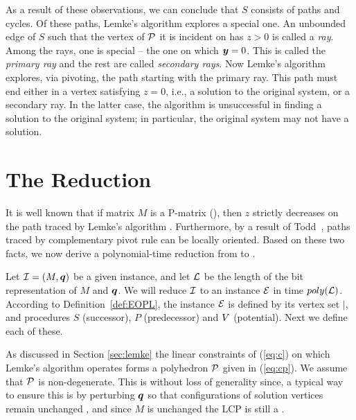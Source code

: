 As a result of these observations, we can conclude that $S$ consists of paths and cycles.  Of these paths, Lemke's algorithm
explores a special one.  An unbounded edge of $S$ such that the vertex of $\mbox{${\mathcal P}$}$ it is incident on has $z > 0$ is called a
{\em ray}.  Among the rays, one is special -- the one on which $\mbox{\boldmath $y$} = 0$. This is called the {\em primary ray} and the rest
are called {\em secondary rays}. Now Lemke's algorithm explores, via pivoting, the path starting with the primary ray. This
path must end either in a vertex satisfying $z = 0$, i.e., a solution to the original system, or a secondary ray. In the
latter case, the algorithm is unsuccessful in finding a solution to the original system; in particular, the original system
may not have a solution.  

\section{The Reduction}

It is well known that if matrix $M$ is a P-matrix (\PLCP), then $z$ strictly
decreases on the path traced by Lemke's algorithm \cite{cottle2009linear}.
Furthermore, by a result of Todd~\cite[Section 5]{todd1976orientation}, paths traced by
complementary pivot rule can be locally oriented.  Based on these two facts, 
we now derive a polynomial-time reduction from \PLCP to \EOPL.

Let $\mbox{${\mathcal I}$}=(M,\mbox{\boldmath $q$})$ be a given \PLCP instance, and let $\mbox{${\mathcal L}$}$ be the length of the 
bit representation of $M$ and $\mbox{\boldmath $q$}$. 
We will reduce $\mbox{${\mathcal I}$}$ to an \EOPL instance $\mbox{${\mathcal E}$}$ in time $poly(\mbox{${\mathcal L}$})$. 
According to Definition~\ref{def:EOPL}, the instance $\mbox{${\mathcal E}$}$ is defined 
by its vertex set $\vert$, and procedures $S$ (successor), $P$ (predecessor) and $\mbox{$V$}$ (potential). 
Next we define each of these. 

As discussed in Section \ref{sec:lemke} the linear constraints of (\ref{eq:c})
on which Lemke's algorithm operates forms a polyhedron $\mbox{${\mathcal P}$}$ given in
(\ref{eq:cp}). We assume that $\mbox{${\mathcal P}$}$ is non-degenerate. This is without
loss of generality since, a typical way to ensure this is by perturbing $\mbox{\boldmath $q$}$ so
that configurations of solution vertices remain unchanged
\cite{cottle2009linear}, and since $M$ is unchanged the LCP is still a \PLCP. 

